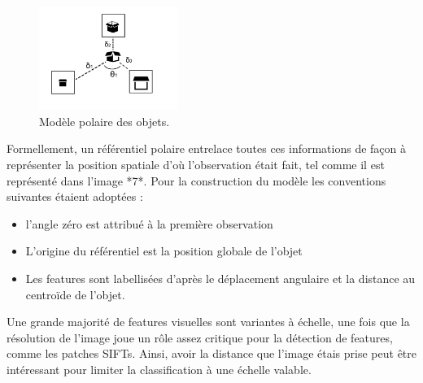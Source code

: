 \begin{figure}[H]
  \centering
  \includegraphics[width=0.4\textwidth]{object_model.png}
  \caption{Modèle polaire des objets.}
\end{figure}

Formellement, un référentiel polaire entrelace toutes ces informations
de façon à représenter la position spatiale d'où l'observation était
fait, tel comme il est représenté dans l'image *7*. Pour la
construction du modèle les conventions suivantes étaient adoptées :
\begin{itemize}
\item l'angle zéro est attribué à la première observation
\item L'origine du référentiel est la position globale de l’objet
\item Les features sont labellisées d'après le déplacement angulaire
  et la distance au centroïde de l'objet.
\end{itemize}

Une grande majorité de features visuelles sont variantes à échelle, une
fois que la résolution de l’image joue un rôle assez critique pour la
détection de features, comme les patches SIFTs. Ainsi, avoir la distance
que l’image étais prise peut être intéressant pour limiter la
classification à une échelle valable.



